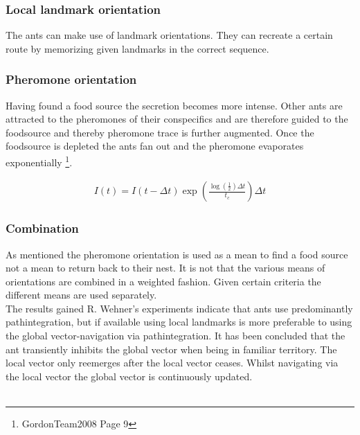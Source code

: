 \documentclass[11pt]{article}
\begin{document}
\subsubsection{Local landmark orientation }
The ants can make use of landmark orientations. They can recreate a certain route by memorizing given landmarks in the correct sequence.

\subsubsection{Pheromone orientation}
Having found a food source the secretion becomes more intense. Other ants are attracted to the pheromones of their conspecifics and are therefore guided to the foodsource and thereby pheromone trace is further augmented. Once the foodsource is depleted the ants fan out and the pheromone evaporates exponentially \footnote{GordonTeam2008 \cite{GordonTeam2008} Page 9}.

 \begin{align*}
 I(t)=I(t - \Delta t) \exp (\frac{\log (\frac{1}{2}) \Delta  t}{t_{c}})\Delta t 
 \end{align*}
 
 
 










\subsubsection{Combination}
As mentioned the pheromone orientation is used as a mean to find a food source not a mean to return back to their nest.
It is not that the various means of orientations are combined in a weighted fashion. Given certain criteria the different means are used separately.\\
The results gained R. Wehner's experiments indicate that ants use predominantly pathintegration, but if available using local landmarks is more preferable to using the global vector-navigation via pathintegration. It has been concluded that the ant transiently inhibits the global vector when being in familiar territory. The local vector only reemerges after the local vector ceases. Whilst navigating via the local vector the global vector is continuously updated.
\\ \
\end{document}
